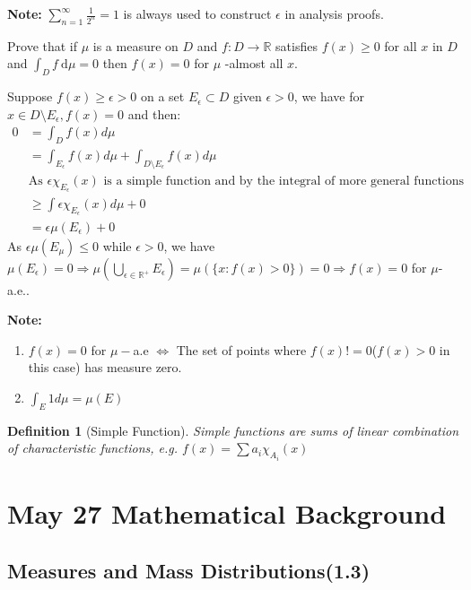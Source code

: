 \documentclass[12pt, a4paper]{article}
\newtheorem{definition}{Definition}[subsection]
\begin{document}
\textbf{Note: }$\displaystyle \sum_{n=1}^{\infty} \frac{1}{2^n} = 1$ is always used to construct $\epsilon$ in analysis proofs.
 
\begin{customexercise}{1.24}
    Prove that if $\mu$ is a measure on $D$ and $f: D \rightarrow \mathbb{R}$ satisfies $f(x) \geq 0$ for all $x$ in $D$ and $\int_{D} f \mathrm{~d} \mu=0$ then $f(x)=0$ for $\mu$ -almost all $x$.
\end{customexercise}

\begin{customsol}{1.24}
Suppose $f(x)\geq\epsilon>0$ on a set $E_\epsilon\subset D$ given $\epsilon>0$, we have for $x\in D\setminus E_\epsilon, f(x)=0$ and then:
$$\begin{aligned}
    0 &= \int_D f(x) d\mu\\ &= \int_{E_\epsilon} f(x)d\mu + \int_{D\setminus E_\epsilon} f(x)d\mu\\
    &\text{As }\epsilon \chi_{E_\epsilon}(x) \text{ is a simple function and by the integral of more general functions}\\
    &\geq \int \epsilon \chi_{E_\epsilon}(x) d\mu + 0 \\ &= \epsilon\mu(E_\epsilon) + 0
\end{aligned}$$
As $\epsilon\mu(E_\mu)\leq 0$ while $\epsilon>0$, we have $\mu(E_\epsilon) = 0 \Rightarrow \mu\left(\bigcup_{\epsilon\in\mathbb{R}^+} E_\epsilon\right) = \mu\left(\{x: f(x)>0\}\right) = 0\Rightarrow f(x) = 0$ for $\mu$-a.e.. 
\end{customsol}

\textbf{Note: } 
\begin{enumerate}
    \item $f(x) = 0$ for $\mu-$a.e $\Leftrightarrow$ The set of points where $f(x)!=0$($f(x)>0$ in this case) has measure zero.
    \item $\displaystyle\int_E 1 d\mu = \mu(E)$
\end{enumerate}
\begin{definition}[Simple Function]
    Simple functions are sums of linear combination of characteristic functions, e.g. $\displaystyle f(x) = \sum a_i \chi_{A_i}(x)$
\end{definition}

\newpage
\section{May 27 Mathematical Background}
\subsection{Measures and Mass Distributions(1.3)}
\end{document}
